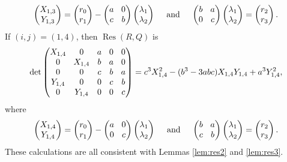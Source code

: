 \documentclass[11pt]{article}
\DeclareMathOperator{\Res}{Res}
\numberwithin{equation}{section}
\begin{document}
\[\arraycolsep4.5pt
\begin{pmatrix}
X_{1,3}\\
Y_{1,3}\end{pmatrix}
=\begin{pmatrix}
r_0\\
r_1\end{pmatrix}
-\begin{pmatrix}
a & 0 \\
c & b
\end{pmatrix}\begin{pmatrix}
\lambda_1 \\
\lambda_2 \end{pmatrix}\quad\text{ and }\quad\begin{pmatrix}
b & a \\
0 & c
\end{pmatrix}\begin{pmatrix}
\lambda_1 \\
\lambda_2
\end{pmatrix}=\begin{pmatrix}
r_2 \\
r_3
\end{pmatrix}.
\]
If $(i,j)=(1,4)$, then $\Res(R,Q)$ is
\[\arraycolsep4.5pt
\det\begin{pmatrix}
X_{1,4} & 0 & a& 0& 0 \\
0 & X_{1,4}& b& a& 0 \\
0 & 0& c& b& a \\
Y_{1,4} & 0& 0& c& b \\
0 & Y_{1,4}& 0& 0& c \\
\end{pmatrix}=c^3 X_{1,4}^2 - (b^3 - 3 a b c) X_{1,4} Y_{1,4} + a^3 Y_{1,4}^2,
\]
where
\[\arraycolsep4.5pt
\begin{pmatrix}
X_{1,4}\\
Y_{1,4}\end{pmatrix}
=\begin{pmatrix}
r_0\\
r_1\end{pmatrix}
-\begin{pmatrix}
a & 0 \\
0 & c
\end{pmatrix}\begin{pmatrix}
\lambda_1 \\
\lambda_2
\end{pmatrix}\quad\text{ and }\quad\begin{pmatrix}
b & a \\
c & b
\end{pmatrix}\begin{pmatrix}
\lambda_1 \\
\lambda_2
\end{pmatrix}=\begin{pmatrix}
r_2 \\
r_3
\end{pmatrix}.
\]
These calculations are all consistent with Lemmas \ref{lem:res2} and \ref{lem:res3}.
\end{document}
